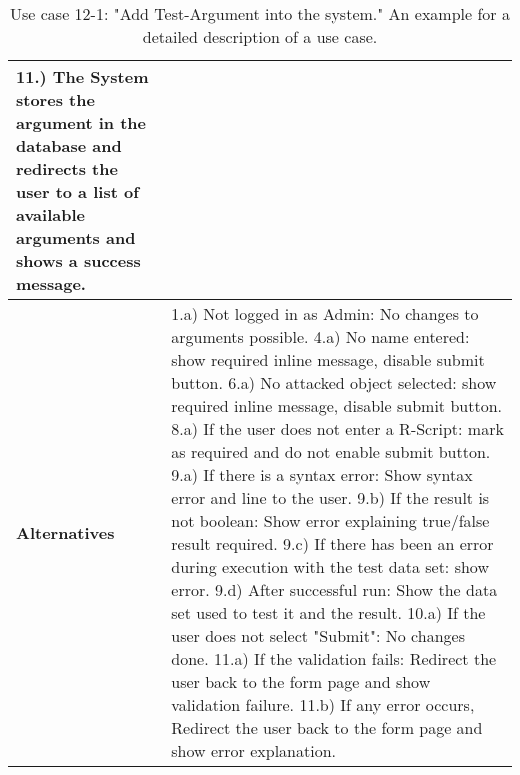 \begin{table}[h]
{\begin{tabular}{|p{1.5cm} p{11.5cm}|}
				11.) The System stores the argument in the database and redirects the user to a list of available arguments and shows a success message.
			\\
			\hline
				\textbf{Alternatives} & 
								1.a) Not logged in as Admin: No changes to arguments possible.
					\newline	4.a) No name entered: show required inline message, disable submit button.
					\newline	6.a) No attacked object selected: show required inline message, disable submit button.
					\newline	8.a) If the user does not enter a R-Script: mark as required and do not enable submit button.
					\newline	9.a) If there is a syntax error: Show syntax error and line to the user.
					\newline	9.b) If the result is not boolean: Show error explaining true/false result required.
					\newline	9.c) If there has been an error during execution with the test data set: show error.
					\newline	9.d) After successful run: Show the data set used to test it and the result.
					\newline	10.a) If the user does not select "Submit": No changes done.
					\newline	11.a) If the validation fails: Redirect the user back to the form page and show validation failure.
					\newline	11.b) If any error occurs,  Redirect the user back to the form page and show error explanation.
								\\
			\hline
	
	\end{tabular}
	}

	\caption{Use case 12-1: "Add Test-Argument into the system." An example for a detailed description of a use case.	\label{uc:121}}
\end{table}
